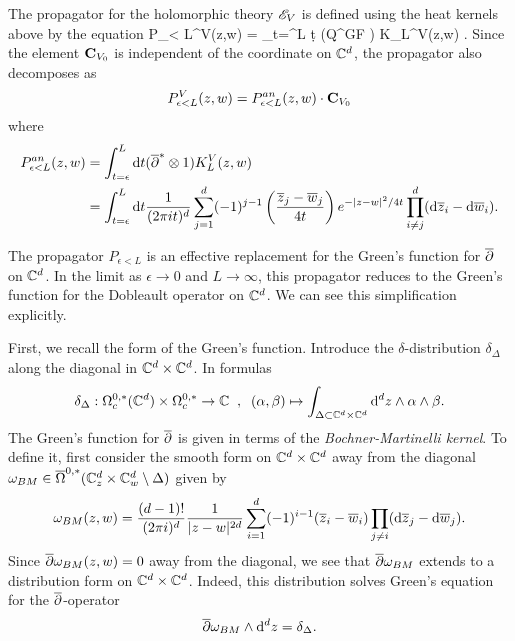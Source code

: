 \documentclass[10pt]{amsart}
\begin{document}
The propagator for the holomorphic theory $\mathscr E_V$ is defined using the heat kernels above by the equation
\ben
P_{\epsilon < L}^V(z,w) = \int_{t=\epsilon}^L \d t (Q^{GF} ) K_{L}^V(z,w) .
\een
Since the element ${\bf C}_{V_0}$ is independent of the coordinate on $\mathbb C^d$, the propagator also decomposes as 
\[
P_{\epsilon < L}^V(z,w) = P_{\epsilon < L}^{an}(z,w) \cdot {\bf C}_{V_0}
\]
where
\begin{align*}
P_{\epsilon < L}^{an}(z,w) & = \int_{t=\epsilon}^L {\rm d} t (\overline{\partial}^* \otimes 1) K_{L}^V(z,w) \\
& = \int_{t=\epsilon}^L {\rm d} t \frac{1}{(2 \pi i t)^d} \sum_{j=1}^d (-1)^{j-1}  \left(\frac{\overline{z}_j - \overline{w}_j}{4 t} \right)  e^{-|z-w|^2 / 4t}  \prod_{i \ne j}^d ({\rm d} \overline{z}_i - {\rm d} \overline{w}_i) .
\end{align*}

The propagator $P_{\epsilon <L}$ is an effective replacement for the Green's function for $\overline{\partial}$ on $\mathbb C^d$. 
In the limit as $\epsilon \to 0$ and $L \to \infty$, this propagator reduces to the Green's function for the Dobleault operator on $\mathbb C^d$.
We can see this simplification explicitly. 

First, we recall the form of the Green's function.
Introduce the $\delta$-distribution $\delta_\Delta$ along the diagonal in $\mathbb C^d \times \mathbb C^d$.
In formulas
\[
\delta_{\Delta} : \Omega^{0,*}_c(\mathbb C^d) \times \Omega^{0,*}_c \to \mathbb C \;\; , \;\; (\alpha, \beta) \mapsto \int_{\Delta \subset \mathbb C^d \times \mathbb C^d} {\rm d}^d z \wedge \alpha \wedge \beta.
\]
The Green's function for $\overline{\partial}$ is given in terms of the {\em Bochner-Martinelli kernel}.
To define it, first consider the smooth form on $\mathbb C^d \times \mathbb C^d$ away from the diagonal
$\omega_{BM} \in \overline{\Omega}^{0,*}(\mathbb C_z^d \times \mathbb C_w^d \setminus \Delta)$ given by
\[
\omega_{BM}(z,w) = \frac{(d-1)!}{(2\pi i)^d} \frac{1}{|z-w|^{2d}} \sum_{i=1}^d (-1)^{i-1} (\overline{z}_i - \overline{w}_i) \prod_{j \ne i} ({\rm d} \overline{z}_j - {\rm d} \overline{w}_j) .
\]
Since $\overline{\partial} \omega_{BM}(z,w) = 0$ away from the diagonal, we see that $\overline{\partial} \omega_{BM}$ extends to a distribution form on $\mathbb C^d \times \mathbb C^d$. 
Indeed, this distribution solves Green's equation for the $\overline{\partial}$-operator
\[
\overline{\partial} \omega_{BM} \wedge {\rm d}^d z = \delta_{\Delta} .
\] 
\end{document}
